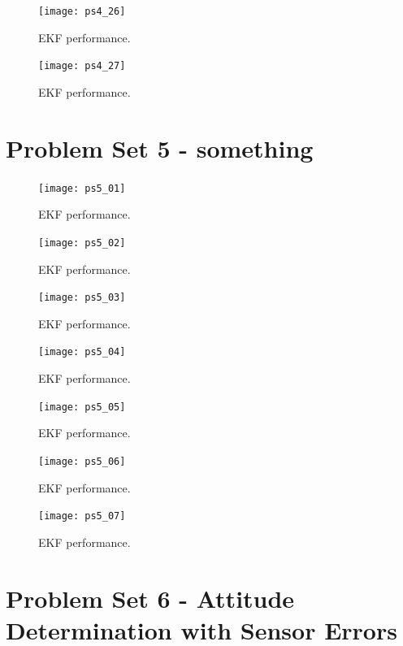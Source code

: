 \documentclass[12pt, letterpaper]{article}
\begin{document}
\begin{figure}[H]
	\centering
	\texttt{[image: ps4\_26]}
	\caption{EKF performance.}
	\label{5:ekf}
\end{figure}

\begin{figure}[H]
	\centering
	\texttt{[image: ps4\_27]}
	\caption{EKF performance.}
	\label{5:ekf}
\end{figure}







\section{Problem Set 5 - something}



\begin{figure}[H]
	\centering
	\texttt{[image: ps5\_01]}
	\caption{EKF performance.}
	\label{5:ekf}
\end{figure}


\begin{figure}[H]
	\centering
	\texttt{[image: ps5\_02]}
	\caption{EKF performance.}
	\label{5:ekf}
\end{figure}


\begin{figure}[H]
	\centering
	\texttt{[image: ps5\_03]}
	\caption{EKF performance.}
	\label{5:ekf}
\end{figure}


\begin{figure}[H]
	\centering
	\texttt{[image: ps5\_04]}
	\caption{EKF performance.}
	\label{5:ekf}
\end{figure}


\begin{figure}[H]
	\centering
	\texttt{[image: ps5\_05]}
	\caption{EKF performance.}
	\label{5:ekf}
\end{figure}


\begin{figure}[H]
	\centering
	\texttt{[image: ps5\_06]}
	\caption{EKF performance.}
	\label{5:ekf}
\end{figure}


\begin{figure}[H]
	\centering
	\texttt{[image: ps5\_07]}
	\caption{EKF performance.}
	\label{5:ekf}
\end{figure}

\section{Problem Set 6 - Attitude Determination with Sensor Errors}
\end{document}
